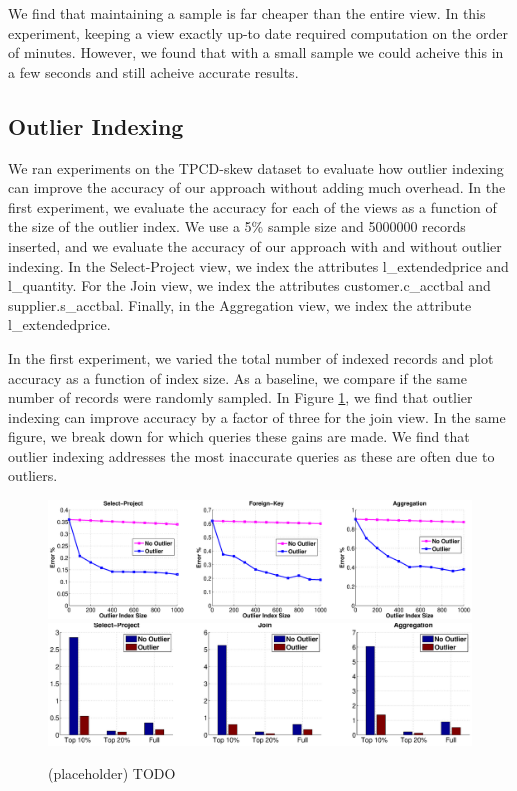 We find that maintaining a sample is far cheaper than the entire view. In this experiment, keeping a view exactly up-to date required computation on the order of minutes.
However, we found that with a small sample we could acheive this in a few seconds and still acheive accurate results.

\subsection{Outlier Indexing}
We ran experiments on the TPCD-skew dataset to evaluate how outlier indexing can improve the accuracy of our approach without adding much overhead.
In the first experiment, we evaluate the accuracy for each of the views as a function of the size of the outlier index. 
We use a 5\% sample size and 5000000 records inserted, and we evaluate the accuracy of our approach with and without outlier indexing.
In the Select-Project view, we index the attributes l\_extendedprice and l\_quantity.
For the Join view, we index the attributes customer.c\_acctbal and supplier.s\_acctbal.
Finally, in the Aggregation view, we index the attribute l\_extendedprice.

In the first experiment, we varied the total number of indexed records and plot accuracy as a function of index size.
As a baseline, we compare if the same number of records were randomly sampled.
In Figure \ref{exp7outlier}, we find that outlier indexing can improve accuracy by a factor of three for the join view. 
In the same figure, we break down for which queries these gains are made. 
We find that outlier indexing addresses the most inaccurate queries as these are often due to outliers. 
\begin{figure}[ht!]
\label{exp7outlier}
\centering
\includegraphics[width=\textwidth]{exp/exp6-outlier.eps}
\includegraphics[width=\textwidth]{exp/exp7-outlier.eps}
 \caption{(placeholder) TODO}
\end{figure}

